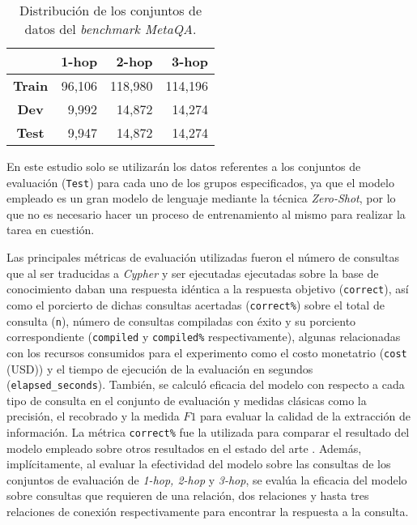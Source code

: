 \begin{table}[h]
\centering
\begin{tabular}{|c|r|r|r|}
\hline
 & \textbf{1-hop} & \textbf{2-hop} & \textbf{3-hop} \\ \hline
\textbf{Train} & 96,106 & 118,980 & 114,196 \\ \hline
\textbf{Dev} & 9,992 & 14,872 & 14,274 \\ \hline
\textbf{Test} & 9,947 & 14,872 & 14,274 \\ \hline
\end{tabular}
\caption{Distribución de los conjuntos de datos del \textit{benchmark MetaQA}.}
\label{tab:metaqatable}
\end{table}

En este estudio solo se utilizarán los datos referentes a los conjuntos de evaluación (\texttt{Test}) para cada uno de los grupos especificados, ya que el modelo empleado es un gran modelo de lenguaje mediante la técnica \textit{Zero-Shot}, por lo que no es necesario hacer un proceso de entrenamiento al mismo para realizar la tarea en cuestión.

Las principales métricas de evaluación utilizadas fueron el número de consultas que al ser traducidas a \textit{Cypher} y ser ejecutadas ejecutadas sobre la base de conocimiento daban una respuesta idéntica a la respuesta objetivo (\texttt{correct}), así como el porcierto de dichas consultas acertadas (\texttt{correct\%}) sobre el total de consulta (\texttt{n}), número de consultas compiladas con éxito y su porciento correspondiente (\texttt{compiled} y \texttt{compiled\%} respectivamente), algunas relacionadas con los recursos consumidos para el experimento como el costo monetatrio (\texttt{cost} (USD)) y el tiempo de ejecución de la evaluación en segundos (\texttt{elapsed\_seconds}). También, se calculó eficacia del modelo con respecto a cada tipo de consulta en el conjunto de evaluación y medidas clásicas como la precisión, el recobrado y la medida $F1$ para evaluar la calidad de la extracción de información. La métrica \texttt{correct\%} fue la utilizada para comparar el resultado del modelo empleado sobre otros resultados en el estado del arte \cite{gpt4all}. Además, implícitamente, al evaluar la efectividad del modelo sobre las consultas de los conjuntos de evaluación de \textit{1-hop, 2-hop} y \textit{3-hop}, se evalúa la eficacia del modelo sobre consultas que requieren de una relación, dos relaciones y hasta tres relaciones de conexión respectivamente para encontrar la respuesta a la consulta.

